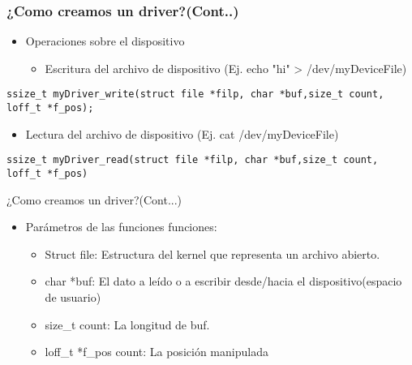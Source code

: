 \begin{frame}[fragile]
\frametitle{¿Como creamos un driver?(Cont..)}
  \begin{itemize}
  \item Operaciones sobre el dispositivo  
  \begin{itemize}
    \item Escritura del archivo de dispositivo (Ej. echo "hi" > /dev/myDeviceFile) 
  \end{itemize}	
  \end{itemize}
\begin{lstlisting}
ssize_t myDriver_write(struct file *filp, char *buf,size_t count, loff_t *f_pos);
\end{lstlisting}

\begin{itemize}
  \item Lectura del archivo de dispositivo  (Ej. cat /dev/myDeviceFile)  
 \end{itemize}

\begin{lstlisting}
ssize_t myDriver_read(struct file *filp, char *buf,size_t count, loff_t *f_pos)
\end{lstlisting}
\end{frame}

\begin{frame}{¿Como creamos un driver?(Cont...)}
  \begin{itemize}
  \item Parámetros de las funciones funciones:
 	 \begin{itemize}
 	   \item Struct file: Estructura del kernel que representa un archivo abierto.
	   \item char *buf: El dato a leído o a escribir desde/hacia el dispositivo(espacio de usuario) 
	   \item size\_t count: La longitud de buf. 
           \item loff\_t *f\_pos count: La posición manipulada
 	 \end{itemize}  
  \end{itemize}
\end{frame}

	

